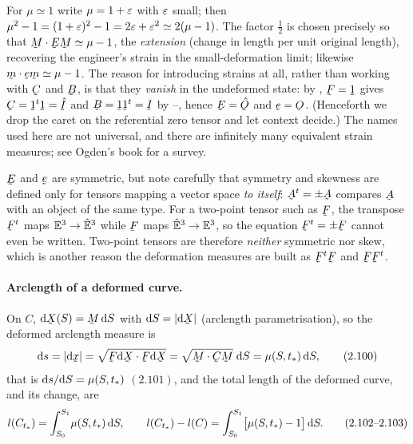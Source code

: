 \begin{remark}\label{rem:half}
For $\mu\simeq1$ write $\mu=1+\varepsilon$ with $\varepsilon$ small; then
$\mu^{2}-1=(1+\varepsilon)^{2}-1=2\varepsilon+\varepsilon^{2}\simeq2(\mu-1)$. The factor $\tfrac12$
is chosen precisely so that $\ip\bM{\bE\bM}\simeq\mu-1$, the
\emph{extension} (change in length per unit original length), recovering the
engineer's strain in the small-deformation limit; likewise
$\ip\bmm{\vek{e}\bmm}\simeq\mu-1$. The reason for introducing strains at
all, rather than working with $\bC$ and $\bB$, is that they \emph{vanish} in
the undeformed state: by , $\bF=\vek{1}$ gives
$\bC=\vek{1}^{t}\vek{1}=\hat\I$ and $\bB=\vek{1}\vek{1}^{t}=\I$
by --, hence $\bE=\hat\Ob$ and $\vek{e}=\Ob$. (Henceforth
we drop the caret on the referential zero tensor and let context decide.)
The names used here are not universal, and there are infinitely many
equivalent strain measures; see Ogden's book for a survey.
\end{remark}

\begin{remark}\label{rem:nosym}
$\bE$ and $\vek{e}$ are symmetric, but note carefully that symmetry and
skewness are defined only for tensors mapping a vector space \emph{to
itself}: $\bA^{t}=\pm\bA$ compares $\bA$ with an object of the same type.
For a two-point tensor such as $\bF$, the transpose $\bF^{t}$ maps $\mathbb{E}^{3}\to\hat{\mathbb{E}}^{3}$
while $\bF$ maps $\hat{\mathbb{E}}^{3}\to\mathbb{E}^{3}$, so the equation $\bF^{t}=\pm\bF$ cannot even be
written. Two-point tensors are therefore \emph{neither} symmetric nor skew,
which is another reason the deformation measures are built as $\bF^{t}\bF$
and $\bF\bF^{t}$.
\end{remark}

\paragraph*{Arclength of a deformed curve.}
On $C$, $\dl\bX(S)=\bM\,\dl S$ with $\dl S=|\dl\bX|$ (arclength
parametrisation), so the deformed arclength measure is
\begin{equation}
   \dl s=|\dl\bx|=\sqrt{\ip{\bF\dl\bX}{\bF\dl\bX}}
   =\sqrt{\ip\bM{\bC\bM}}\;\dl S=\mu(S,t_*)\,\dl S, \tag{2.100}\label{eq:2.100}
\end{equation}
that is $\mathrm{d} s/\mathrm{d} S=\mu(S,t_*)$ $(2.101)$, and the total length of the
deformed curve, and its change, are
\begin{equation}
   l(C_{t_*})=\int_{S_0}^{S_1}\!\mu(S,t_*)\,\mathrm{d} S,\qquad
   l(C_{t_*})-l(C)=\int_{S_0}^{S_1}\!\big[\mu(S,t_*)-1\big]\,\mathrm{d} S. \tag{2.102--2.103}\label{eq:2.102}
\end{equation}

